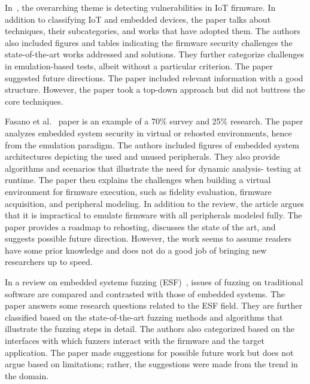 In~\cite{feng_detecting_2023}, the overarching theme is detecting vulnerabilities in IoT firmware. In addition to classifying IoT and embedded devices, the paper talks about techniques, their subcategories, and works that have adopted them. The authors also included figures and tables indicating the firmware security challenges the state-of-the-art works addressed and solutions. They further categorize challenges in emulation-based tests, albeit without a particular criterion. The paper suggested future directions. The paper included relevant information with a good structure. However, the paper took a top-down approach but did not buttress the core techniques.

Fasano et al.~\cite{fasano_sok_2021} paper is an example of a 70\% survey and 25\% research. The paper analyzes embedded system security in virtual or rehosted environments, hence from the emulation paradigm. The authors included figures of embedded system architectures depicting the used and unused peripherals. They also provide algorithms and scenarios that illustrate the need for dynamic analysis- testing at runtime. The paper then explains the challenges when building a virtual environment for firmware execution, such as fidelity evaluation, firmware acquisition, and peripheral modeling. In addition to the review, the article argues that it is impractical to emulate firmware with all peripherals modeled fully. The paper provides a roadmap to rehosting, discusses the state of the art, and suggests possible future direction. However, the work seems to assume readers have some prior knowledge and does not do a good job of bringing new researchers up to speed.

In a review on embedded systems fuzzing (ESF)~\cite{yun_fuzzing_2022}, issues of fuzzing on traditional software are compared and contrasted with those of embedded systems. The paper answers some research questions related to the ESF field. They are further classified based on the state-of-the-art fuzzing methods and algorithms that illustrate the fuzzing steps in detail. The authors also categorized based on the interfaces with which fuzzers interact with the firmware and the target application. The paper made suggestions for possible future work but does not argue based on limitations; rather, the suggestions were made from the trend in the domain.~\nocite{nadir_taxonomy_2022, qasem_automatic_2021, eisele_embedded_2022}




